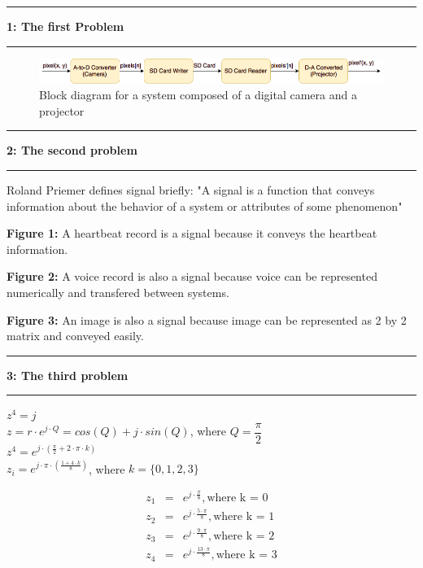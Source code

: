 \documentclass[11pt]{article}
\newcommand\question[2]{\vspace{.25in}\hrule\textbf{#1: #2}\vspace{.5em}\hrule\vspace{.10in}}
\newcommand\tab[1][1cm]{\hspace*{#1}}
\begin{document}
\raggedright
\newcommand\NAME{Kadir Emre Oto}  %
\newcommand\ANDREWID{150140032}     %
\newcommand\HWNUM{1}              %


\question{1}{The first Problem} 

\begin{figure}[h]
	\centering
	\includegraphics[width=0.7\linewidth]{figure1}
	\caption{Block diagram for a system composed of a digital camera and a projector}
	\label{fig:figure1}
\end{figure}

\question{2}{The second problem}

Roland Priemer defines signal briefly: "A signal is a function that conveys information about the behavior of a system or attributes of some phenomenon" \cite{isp}

\tab \textbf{Figure 1: } A heartbeat record is a signal because it conveys the heartbeat information.

\tab \textbf{Figure 2: } A voice record is also a signal because voice can be represented numerically and transfered between systems.

\tab \textbf{Figure 3: } An image is also a signal because image can be represented as 2 by 2 matrix and conveyed easily. 

\question{3}{The third problem}

\begin{center}
	$ z^4 = j $ \\
	$ z = r \cdot e^{j \cdot Q} = cos(Q) + j \cdot sin(Q)$, where $ Q = \dfrac{\pi}{2}  $ \\
	$ z^4 = e^{j \cdot \left( \frac{\pi}{2} + 2 \cdot \pi \cdot k  \right)} $ \\
	$ z_i = e^{j \cdot \pi \cdot \left( \frac{1 + 4 \cdot k}{8}  \right)} $, where $k = \{0, 1, 2, 3\}$ 
\end{center}
\begin{eqnarray*}
	z_1 &=& e^{j \cdot \frac{\pi}{8}}, \text{where k = 0} \\ 
	z_2 &=& e^{j \cdot \frac{5 \cdot \pi}{8}} , \text{where k = 1}  \\
	z_3 &=& e^{j \cdot \frac{9 \cdot \pi}{8}} , \text{where k = 2} \\
	z_4 &=& e^{j \cdot \frac{13 \cdot \pi}{8}} , \text{where k = 3} \\
\end{eqnarray*}
\end{document}
